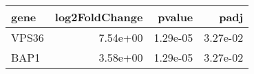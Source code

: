 \begin{tabular}{lrrr}
\toprule
 gene &  log2FoldChange &   pvalue &     padj \\
\midrule
VPS36 &        7.54e+00 & 1.29e-05 & 3.27e-02 \\
 BAP1 &        3.58e+00 & 1.29e-05 & 3.27e-02 \\
\bottomrule
\end{tabular}

